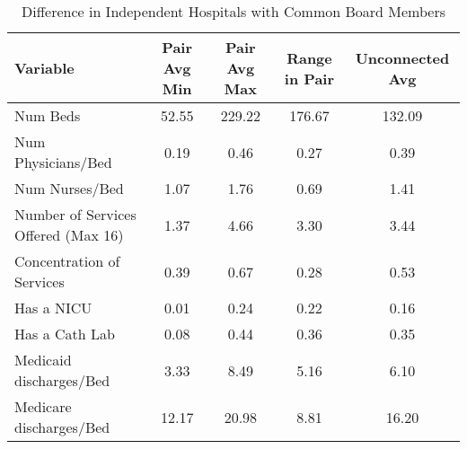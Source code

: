 \begin{table}[ht!]
\centering
\caption{Difference in Independent Hospitals with Common Board Members}
\centering
\begin{tabular}[t]{lcccc}
\toprule
Variable & Pair Avg Min & Pair Avg Max & Range in Pair & Unconnected Avg\\
\midrule
Num Beds & 52.55 & 229.22 & 176.67 & 132.09\\
Num Physicians/Bed & 0.19 & 0.46 & 0.27 & 0.39\\
Num Nurses/Bed & 1.07 & 1.76 & 0.69 & 1.41\\
Number of Services Offered (Max 16) & 1.37 & 4.66 & 3.30 & 3.44\\
Concentration of Services & 0.39 & 0.67 & 0.28 & 0.53\\
\addlinespace
Has a NICU & 0.01 & 0.24 & 0.22 & 0.16\\
Has a Cath Lab & 0.08 & 0.44 & 0.36 & 0.35\\
Medicaid discharges/Bed & 3.33 & 8.49 & 5.16 & 6.10\\
Medicare discharges/Bed & 12.17 & 20.98 & 8.81 & 16.20\\
\bottomrule
\end{tabular}
\end{table}
